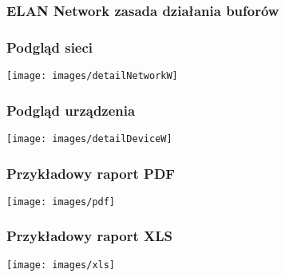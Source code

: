 \documentclass[ucs]{beamer}
\begin{document}
\begin{frame}
\frametitle{ELAN Network zasada działania buforów}

\end{frame}

\begin{frame}
\frametitle{Podgląd sieci}
\texttt{[image: images/detailNetworkW]}
\end{frame}

\begin{frame}
\frametitle{Podgląd urządzenia}
\texttt{[image: images/detailDeviceW]}
\end{frame}

\begin{frame}
\frametitle{Przykładowy raport PDF}
\begin{center}
\texttt{[image: images/pdf]}
\end{center}
\end{frame}

\begin{frame}
\frametitle{Przykładowy raport XLS}
\begin{center}
\texttt{[image: images/xls]}
\end{center}
\end{frame}
\end{document}
